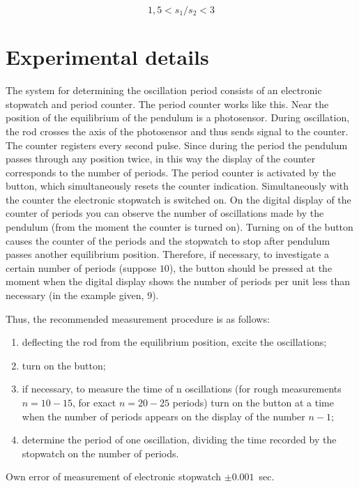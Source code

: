 \documentclass{LabWorkEng}
\begin{document}
\begin{equation}\label{15}
	1,5 < {s_1}/{s_2} < 3
\end{equation}


\section{Experimental details}

The system for determining the oscillation period consists of an electronic stopwatch and period counter. The period counter works like this. Near the position of the equilibrium of the pendulum is a photosensor. During oscillation, the rod crosses the axis of the photosensor and thus sends signal to the counter. The counter registers every second pulse. Since during the period the pendulum passes through any position twice, in this way the display of the counter corresponds to the number of periods. The period counter is activated by the  button, which simultaneously resets the counter indication. Simultaneously with the counter the electronic stopwatch is switched on. On the digital display of the counter of periods you can observe the number of oscillations made by the pendulum (from the moment the counter is turned on). Turning  on of the  button causes the counter of the periods and the stopwatch to stop after pendulum passes another equilibrium position. Therefore, if necessary, to investigate a certain number of periods (suppose $10$), the  button should be pressed at the moment when the digital display shows the number of periods per unit less than necessary (in the example given, $9$).

Thus, the recommended measurement procedure is as follows:
\begin{enumerate}
	\item deflecting the rod from the equilibrium position, excite the oscillations;
	\item  turn on the  button;
	\item if necessary, to measure the time of n oscillations (for rough measurements $n = 10-15$, for exact $n = 20-25$ periods) turn on the  button at a time when the number of periods appears on the display of the number $n-1$;
	\item determine the period of one oscillation, dividing the time recorded by the stopwatch on the number of periods.
\end{enumerate}

Own error of measurement of electronic stopwatch $\pm 0.001$~sec.
\end{document}
